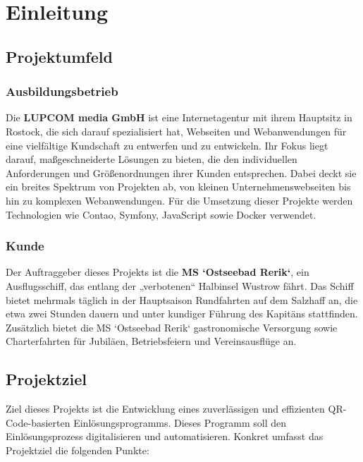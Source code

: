 \section{Einleitung}
\label{sec:Einleitung}


\subsection{Projektumfeld} 
\label{sec:Projektumfeld}

\subsubsection{Ausbildungsbetrieb}

Die \textbf{LUPCOM media GmbH} ist eine Internetagentur mit ihrem Hauptsitz in Rostock, die sich darauf spezialisiert hat, Webseiten und Webanwendungen für eine vielfältige Kundschaft zu entwerfen und zu entwickeln. Ihr Fokus liegt darauf, maßgeschneiderte Lösungen zu bieten, die den individuellen Anforderungen und Größenordnungen ihrer Kunden entsprechen. Dabei deckt sie ein breites Spektrum von Projekten ab, von kleinen Unternehmenswebseiten bis hin zu komplexen Webanwendungen. Für die Umsetzung dieser Projekte werden Technologien wie Contao, Symfony, JavaScript sowie Docker verwendet.

\subsubsection{Kunde}

Der Auftraggeber dieses Projekts ist die \textbf{MS `Ostseebad Rerik`}, ein Ausflugsschiff, das entlang der „verbotenen“ Halbinsel Wustrow fährt. Das Schiff bietet mehrmals täglich in der Hauptsaison Rundfahrten auf dem Salzhaff an, die etwa zwei Stunden dauern und unter kundiger Führung des Kapitäns stattfinden. Zusätzlich bietet die MS `Ostseebad Rerik` gastronomische Versorgung sowie Charterfahrten für Jubiläen, Betriebsfeiern und Vereinsausflüge an.


\subsection{Projektziel} 
\label{sec:Projektziel}

Ziel dieses Projekts ist die Entwicklung eines zuverlässigen und effizienten QR-Code-basierten Einlösungsprogramms. Dieses Programm soll den Einlösungsprozess digitalisieren und automatisieren. Konkret umfasst das Projektziel die folgenden Punkte:

